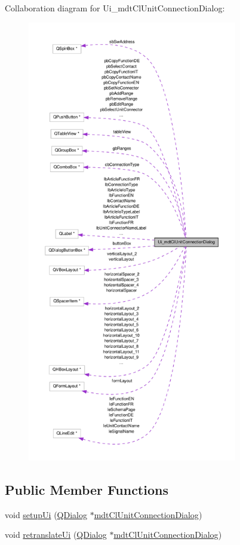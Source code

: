 Collaboration diagram for Ui\-\_\-mdt\-Cl\-Unit\-Connection\-Dialog\-:\nopagebreak
\begin{figure}[H]
\begin{center}
\leavevmode
\includegraphics[height=550pt]{class_ui__mdt_cl_unit_connection_dialog__coll__graph}
\end{center}
\end{figure}
\subsection*{Public Member Functions}
\begin{DoxyCompactItemize}
\item 
void \hyperlink{class_ui__mdt_cl_unit_connection_dialog_ab03eca441063083c64115ba2c708fcfe}{setup\-Ui} (\hyperlink{class_q_dialog}{Q\-Dialog} $\ast$\hyperlink{classmdt_cl_unit_connection_dialog}{mdt\-Cl\-Unit\-Connection\-Dialog})
\item 
void \hyperlink{class_ui__mdt_cl_unit_connection_dialog_af201d521d3b616a316a4ba4e402eb838}{retranslate\-Ui} (\hyperlink{class_q_dialog}{Q\-Dialog} $\ast$\hyperlink{classmdt_cl_unit_connection_dialog}{mdt\-Cl\-Unit\-Connection\-Dialog})
\end{DoxyCompactItemize}
